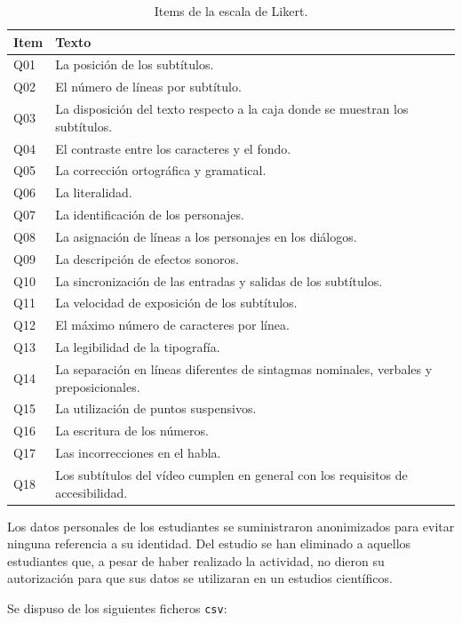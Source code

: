 \documentclass[
  12pt,
  a4paper,
  extrafontsizes,
  onecolumn,
  openright]{memoir}
\begin{document}
\hypertarget{tbl-likert-scale}{}
\begin{longtable}{ll}
\caption{\label{tbl-likert-scale}Items de la escala de Likert. }\tabularnewline

\toprule
Item & Texto \\ 
\midrule
Q01 & La posición de los subtítulos. \\ 
Q02 & El número de líneas por subtítulo. \\ 
Q03 & La disposición del texto respecto a la caja donde se muestran los subtítulos. \\ 
Q04 & El contraste entre los caracteres y el fondo. \\ 
Q05 & La corrección ortográfica y gramatical. \\ 
Q06 & La literalidad. \\ 
Q07 & La identificación de los personajes. \\ 
Q08 & La asignación de líneas a los personajes en los diálogos. \\ 
Q09 & La descripción de efectos sonoros. \\ 
Q10 & La sincronización de las entradas y salidas de los subtítulos. \\ 
Q11 & La velocidad de exposición de los subtítulos. \\ 
Q12 & El máximo número de caracteres por línea. \\ 
Q13 & La legibilidad de la tipografía. \\ 
Q14 & La separación en líneas diferentes de sintagmas nominales, verbales y preposicionales. \\ 
Q15 & La utilización de puntos suspensivos. \\ 
Q16 & La escritura de los números. \\ 
Q17 & Las incorrecciones en el habla. \\ 
Q18 & Los subtítulos del vídeo cumplen en general con los requisitos de accesibilidad. \\ 
\bottomrule
\end{longtable}

Los datos personales de los estudiantes se suministraron anonimizados
para evitar ninguna referencia a su identidad. Del estudio se han
eliminado a aquellos estudiantes que, a pesar de haber realizado la
actividad, no dieron su autorización para que sus datos se utilizaran en
un estudios científicos.

\clearpage

Se dispuso de los siguientes ficheros \texttt{csv}:
\end{document}
